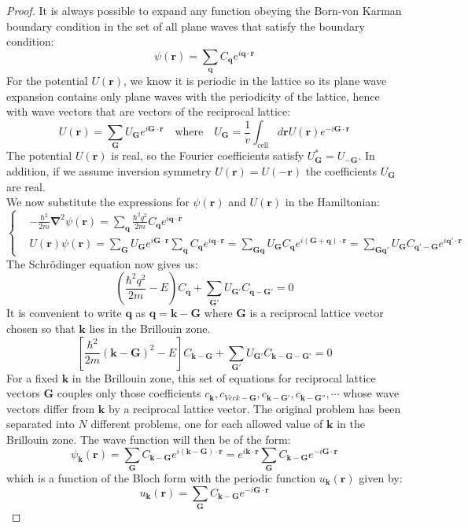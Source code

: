 \documentclass[10.75pt,a4paper,openright,bottom=2cm]{article}
\renewcommand{\Vec}[1]{\boldsymbol{#1}}
\begin{document}
\begin{proof}
It is always possible to expand any function obeying the Born-von Karman boundary condition in the set of all plane waves that satisfy the boundary condition:
\[
\psi(\Vec{r})=\sum_{\Vec{q}}C_{\Vec{q}}e^{i\Vec{q}\cdot\Vec{r}}
\]
For the potential $U(\Vec{r})$, we know it is periodic in the lattice so its plane wave expansion contains only plane waves with the periodicity of the lattice, hence with wave vectors that are vectors of the reciprocal lattice:
\[
U(\Vec{r})=\sum_{\Vec{G}}U_{\Vec{G}}e^{i\Vec{G}\cdot\Vec{r}} \quad \text{where} \quad U_{\Vec{G}}=\frac{1}{v}\int_{\text{cell}}d\Vec{r}U(\Vec{r})e^{-i\Vec{G}\cdot\Vec{r}}
\]
The potential $U(\Vec{r})$ is real, so the Fourier coefficients satisfy $U_{\Vec{G}}^*=U_{-\Vec{G}}$. In addition, if we assume inversion symmetry $U(\Vec{r})=U(-\Vec{r})$ the coefficients $U_{\Vec{G}}$ are real.\\
We now substitute the expressions for $\psi(\Vec{r})$ and $U(\Vec{r})$ in the Hamiltonian:
\[
\left\{
\begin{aligned}
&-\frac{\hbar^2}{2m}\Vec{\nabla}^2\psi(\Vec{r})=\sum_{\Vec{q}}\frac{\hbar^2q^2}{2m}C_{\Vec{q}}e^{i\Vec{q}\cdot\Vec{r}}\\
&U(\Vec{r})\psi(\Vec{r})=\sum_{\Vec{G}}U_{\Vec{G}}e^{i\Vec{G}\cdot\Vec{r}}\sum_{\Vec{q}}C_{\Vec{q}}e^{i\Vec{q}\cdot\Vec{r}}=\sum_{\Vec{G}\Vec{q}}U_{\Vec{G}}C_{\Vec{q}}e^{i(\Vec{G}+\Vec{q})\cdot\Vec{r}}=\sum_{\Vec{G}\Vec{q'}}U_{\Vec{G}}C_{\Vec{q'}-\Vec{G}}e^{i\Vec{q'}\cdot\Vec{r}}
\end{aligned}
\right.
\]
The Schr\"odinger equation now gives us:
\[
\left(\frac{\hbar^2q^2}{2m}-E\right)C_{\Vec{q}}+\sum_{\Vec{G'}}U_{\Vec{G'}}C_{\Vec{q}-\Vec{G'}}=0
\]
It is convenient to write $\Vec{q}$ as $\Vec{q}=\Vec{k}-\Vec{G}$ where $\Vec{G}$ is a reciprocal lattice vector chosen so that $\Vec{k}$ lies in the  Brillouin zone.
\begin{equation}
\label{central}
\left[\frac{\hbar^2}{2m}(\Vec{k}-\Vec{G})^2-E\right]C_{\Vec{k}-\Vec{G}}+\sum_{\Vec{G'}}U_{\Vec{G'}}C_{\Vec{k}-\Vec{G}-\Vec{G'}}=0
\end{equation}
For a fixed $\Vec{k}$ in the  Brillouin zone, this set of equations for reciprocal lattice vectors $\Vec{G}$ couples only those coefficients $c_{\Vec{k}},c_{Vec{k}-\Vec{G}},c_{\Vec{k}-\Vec{G'}}, c_{\Vec{k}-\Vec{G''}},\cdots$ whose wave vectors differ from $\Vec{k}$ by a reciprocal lattice vector. The original problem has been separated into $N$ different problems, one for each allowed value of $\Vec{k}$ in the  Brillouin zone. The wave function will then be of the form:
\[
\psi_{\Vec{k}}(\Vec{r})=\sum_{\Vec{G}}C_{\Vec{k}-\Vec{G}}e^{i(\Vec{k}-\Vec{G})\cdot\Vec{r}}=e^{i\Vec{k}\cdot\Vec{r}}\sum_{\Vec{G}}C_{\Vec{k}-\Vec{G}}e^{-i\Vec{G}\cdot\Vec{r}}
\]
which is a function of the Bloch form with the periodic function $u_{\Vec{k}}(\Vec{r})$ given by:
\[
u_{\Vec{k}}(\Vec{r})=\sum_{\Vec{G}}C_{\Vec{k}-\Vec{G}}e^{-i\Vec{G}\cdot\Vec{r}}
\]
\end{proof}
\end{document}
